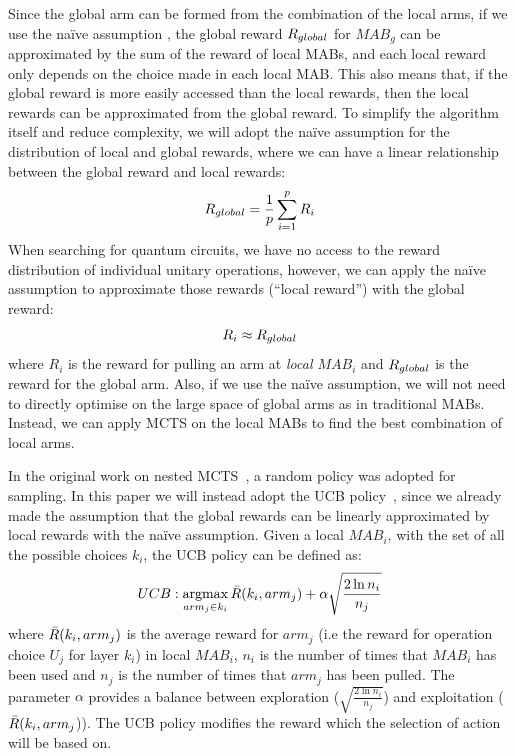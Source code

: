\documentclass{ieeeaccess}
\DeclareMathOperator*{\argmax}{argmax}
\begin{document}
  Since the global arm can be formed from the combination of the local arms, if we use the na\"ive assumption \cite{CMAB_RTS}, the global reward $R_{\rm global}$ for $MAB_g$ can be approximated by the sum of the reward of local MABs, and each local reward only depends on the choice made in each local MAB. This also means that, if the global reward is more easily accessed than the local rewards, then the local rewards can be approximated from the global reward. To simplify the algorithm itself and reduce complexity, we will adopt the na\"ive assumption for the distribution of local and global rewards, where we can have a linear relationship between the global reward and local rewards:
  \begin{equation}
      R_{\rm global} = \frac{1}{p}\sum_{i=1}^p R_i
  \end{equation}
  When searching for quantum circuits, we have no access to the reward distribution of individual unitary operations, however, we can apply the na\"ive assumption to approximate those rewards (``local reward'') with the global reward: 
  \begin{equation}
      R_{i} \approx R_{\rm global}
  \end{equation}
  where $R_{i}$ is the reward for pulling an arm at \textit{local $MAB_i$} and $R_{\rm global}$ is the reward for the global arm.
  Also, if we use the na\"ive assumption, we will not need to directly optimise on the large space of global arms as in  traditional MABs. Instead, we can apply MCTS on the local MABs to find the best combination of local arms.
  
  In the original work on nested MCTS~\cite{nestedmontecarlosearch}, a random policy was adopted for sampling. In this paper we will instead adopt the UCB policy~\cite{UCB_paper_10.5555/944919.944941}, since we already made the assumption that the global rewards can be linearly approximated by local rewards with the na\"ive assumption. Given a local $MAB_i$, with the set of all the possible choices $k_i$, the UCB policy can be defined as:
  \begin{equation}
      UCB: \argmax_{arm_j\in k_i} \Bar{R}(k_i, arm_j) + \alpha \sqrt{\frac{2\ln n_i}{n_j}}
  \end{equation}
  where $\Bar{R}(k_i, arm_j)$ is the average reward for $arm_j$ (i.e the reward for operation choice $U_j$  for layer $k_i$) in local $MAB_i$, $n_i$ is the number of times that $MAB_i$ has been used and $n_j$ is the number of times that $arm_j$ has been pulled. The parameter $\alpha$ provides a balance between exploration ($\sqrt{\frac{2\ln n_i}{n_j}}$) and exploitation ($\Bar{R}(k_i, arm_j$)). The UCB policy modifies the reward which the selection of action will be based on. 
  
\end{document}
